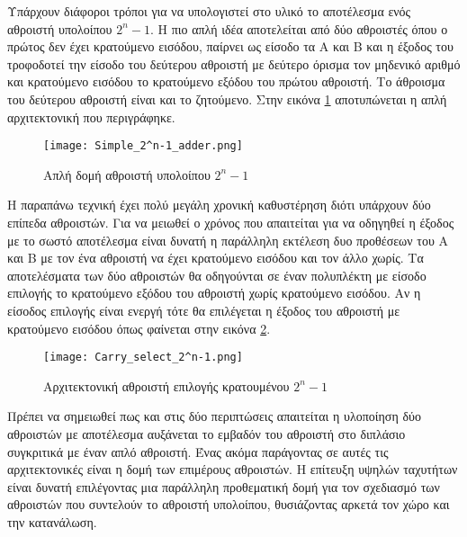 Υπάρχουν διάφοροι τρόποι για να υπολογιστεί στο υλικό το αποτέλεσμα 
ενός αθροιστή υπολοίπου $2^n-1$.
Η πιο απλή ιδέα αποτελείται από δύο αθροιστές όπου ο πρώτος δεν έχει
κρατούμενο εισόδου, παίρνει ως είσοδο τα Α και Β και η έξοδος του τροφοδοτεί
την είσοδο του δεύτερου αθροιστή με δεύτερο όρισμα τον μηδενικό αριθμό
και κρατούμενο εισόδου το κρατούμενο εξόδου του πρώτου αθροιστή. Το άθροισμα 
του δεύτερου αθροιστή είναι και το ζητούμενο. Στην εικόνα \ref{fig:2^n-1_simple_adder}
αποτυπώνεται η απλή αρχιτεκτονική που περιγράφηκε.
\begin{figure}[H]
    \centering
    \texttt{[image: Simple\_2^n-1\_adder.png]}
    \caption{Απλή δομή αθροιστή υπολοίπου $2^n-1$}
    \label{fig:2^n-1_simple_adder}
\end{figure}
Η παραπάνω τεχνική έχει πολύ μεγάλη χρονική καθυστέρηση διότι υπάρχουν δύο 
επίπεδα αθροιστών. Για να μειωθεί ο χρόνος που απαιτείται για να οδηγηθεί η έξοδος
με το σωστό αποτέλεσμα είναι δυνατή η παράλληλη εκτέλεση δυο προθέσεων του Α και Β
με τον ένα αθροιστή να έχει κρατούμενο εισόδου και τον άλλο χωρίς. Τα αποτελέσματα 
των δύο αθροιστών θα οδηγούνται σε έναν πολυπλέκτη με είσοδο επιλογής το κρατούμενο 
εξόδου του αθροιστή χωρίς κρατούμενο εισόδου. Αν η είσοδος επιλογής είναι ενεργή 
τότε θα επιλέγεται η έξοδος του αθροιστή με κρατούμενο εισόδου όπως φαίνεται στην 
 εικόνα \ref{fig:2^n-1_carry_select_adder}.
\begin{figure}[H]
    \centering
    \texttt{[image: Carry\_select\_2^n-1.png]}
    \caption{Αρχιτεκτονική αθροιστή επιλογής κρατουμένου $2^n-1$}
    \label{fig:2^n-1_carry_select_adder}
\end{figure}
Πρέπει να σημειωθεί πως και στις δύο περιπτώσεις απαιτείται η υλοποίηση δύο αθροιστών 
με αποτέλεσμα αυξάνεται το εμβαδόν του αθροιστή στο διπλάσιο συγκριτικά με έναν απλό αθροιστή.
Ένας ακόμα παράγοντας σε αυτές τις αρχιτεκτονικές είναι η δομή των επιμέρους αθροιστών. 
Η επίτευξη υψηλών ταχυτήτων είναι δυνατή επιλέγοντας μια παράλληλη προθεματική δομή 
για τον σχεδιασμό των αθροιστών που συντελούν το αθροιστή υπολοίπου, θυσιάζοντας αρκετά
τον χώρο και την κατανάλωση.

